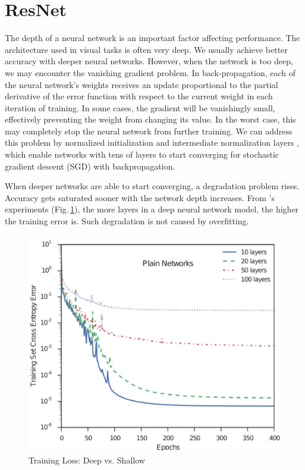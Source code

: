 \section{ResNet}

The depth of a neural network is an important factor affecting performance. The architecture used in visual tasks is often very deep. We usually achieve better accuracy with deeper neural networks. However, when the network is too deep, we may encounter the vanishing gradient problem. In back-propagation, each of the neural network's weights receives an update proportional to the partial derivative of the error function with respect to the current weight in each iteration of training. In some cases, the gradient will be vanishingly small, effectively preventing the weight from changing its value. In the worst case, this may completely stop the neural network from further training. We can address this problem by normalized initialization and intermediate normalization layers \citep{Glorot10understandingthe}, which enable networks with tens of layers to start converging for stochastic gradient descent (SGD) with backpropagation. 

When deeper networks are able to start converging, a degradation problem rises. Accuracy gets saturated sooner with the network depth increases. From \citeauthor{Srivastava2015}'s experiments \cite{Srivastava2015}  (Fig.\,\ref{deeploss}), the more layers in a deep neural network model, the higher the training error is. Such degradation is not caused by overfitting.

\begin{figure}[h]
	\centering
	\includegraphics[scale=0.5]{Figs/deeploss.jpg}
    \caption{Training Loss: Deep vs. Shallow \cite{Srivastava2015}}
    \label{deeploss}
\end{figure}

